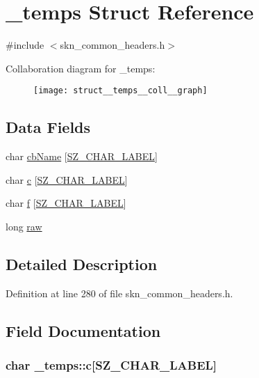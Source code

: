 \hypertarget{struct__temps}{\section{\+\_\+temps Struct Reference}
\label{struct__temps}
}


{\ttfamily \#include $<$skn\+\_\+common\+\_\+headers.\+h$>$}



Collaboration diagram for \+\_\+temps\+:\nopagebreak
\begin{figure}[H]
\begin{center}
\leavevmode
\texttt{[image: struct\_\_temps\_\_coll\_\_graph]}
\end{center}
\end{figure}
\subsection*{Data Fields}
\begin{DoxyCompactItemize}
\item 
char \hyperlink{struct__temps_a74414216b43459f4ebcada36b9b165f5}{cb\+Name} \mbox{[}\hyperlink{skn__common__headers_8h_a3122b900b1a34ceff868e0d51217e357}{S\+Z\+\_\+\+C\+H\+A\+R\+\_\+\+L\+A\+B\+E\+L}\mbox{]}
\item 
char \hyperlink{struct__temps_add683444c2985b00bd51bc69e9026a69}{c} \mbox{[}\hyperlink{skn__common__headers_8h_a3122b900b1a34ceff868e0d51217e357}{S\+Z\+\_\+\+C\+H\+A\+R\+\_\+\+L\+A\+B\+E\+L}\mbox{]}
\item 
char \hyperlink{struct__temps_a9de7d7f00c6df40b61735f25e3247b40}{f} \mbox{[}\hyperlink{skn__common__headers_8h_a3122b900b1a34ceff868e0d51217e357}{S\+Z\+\_\+\+C\+H\+A\+R\+\_\+\+L\+A\+B\+E\+L}\mbox{]}
\item 
long \hyperlink{struct__temps_a62d3522782b91f7fbb444bceb91c1876}{raw}
\end{DoxyCompactItemize}


\subsection{Detailed Description}


Definition at line 280 of file skn\+\_\+common\+\_\+headers.\+h.



\subsection{Field Documentation}
\hypertarget{struct__temps_add683444c2985b00bd51bc69e9026a69}{
\subsubsection[{c}]{\setlength{\rightskip}{0pt plus 5cm}char \+\_\+temps\+::c\mbox{[}{\bf S\+Z\+\_\+\+C\+H\+A\+R\+\_\+\+L\+A\+B\+E\+L}\mbox{]}}}\label{struct__temps_add683444c2985b00bd51bc69e9026a69}


